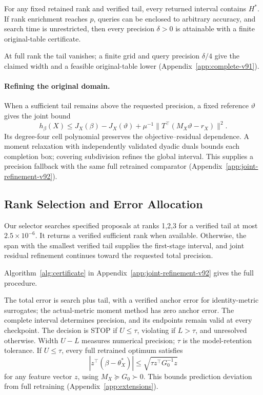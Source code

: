 \begin{proposition}\label{prop:complete-v91}
For any fixed retained rank and verified tail, every returned interval contains $H^*$. If rank enrichment reaches $p$, queries can be enclosed to arbitrary accuracy, and search time is unrestricted, then every precision $\delta>0$ is attainable with a finite original-table certificate.
\end{proposition}
At full rank the tail vanishes; a finite grid and query precision $\delta/4$ give the claimed width and a feasible original-table lower (Appendix~\ref{app:complete-v91}).

\paragraph{Refining the original domain.}
When a sufficient tail remains above the requested precision, a fixed reference $\vartheta$ gives the joint bound
\[
h_\beta(X)\le J_X(\beta)-J_X(\vartheta)+\mu^{-1}\|T^\top(M_X\vartheta-r_X)\|^2.
\]
Its degree-four cell polynomial preserves the objective--residual dependence. A moment relaxation with independently validated dyadic duals bounds each completion box; covering subdivision refines the global interval. This supplies a precision fallback with the same full retrained comparator (Appendix~\ref{app:joint-refinement-v92}).

\subsection{Rank Selection and Error Allocation}
Our selector searches specified proposals at ranks 1,2,3 for a verified tail at most $2.5\times10^{-6}$. It returns a verified sufficient rank when available. Otherwise, the span with the smallest verified tail supplies the first-stage interval, and joint residual refinement continues toward the requested total precision.

Algorithm~\ref{alg:certificate} in Appendix~\ref{app:joint-refinement-v92} gives the full procedure.

The total error is search plus tail, with a verified anchor error for identity-metric surrogates; the actual-metric moment method has zero anchor error. The complete interval determines precision, and its endpoints remain valid at every checkpoint. The decision is STOP if $U\leq\tau$, violating if $L>\tau$, and unresolved otherwise. Width $U-L$ measures numerical precision; $\tau$ is the model-retention tolerance. If $U\le\tau$, every full retrained optimum satisfies
\[
 |z^\top(\beta-\theta_X^*)|\le\sqrt{\tau z^\top G_0^{-1}z}
\]
for any feature vector $z$, using $M_X\succeq G_0\succ0$. This bounds prediction deviation from full retraining (Appendix~\ref{app:extensions}).



